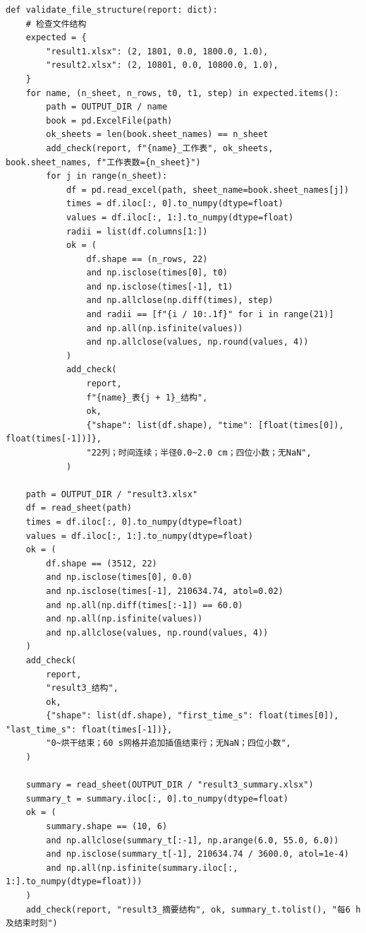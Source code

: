 \documentclass[withoutpreface,bwprint]{cumcm_thesis}
\begin{document}
\begin{appendices}
\begin{lstlisting}
def validate_file_structure(report: dict):
    # 检查文件结构
    expected = {
        "result1.xlsx": (2, 1801, 0.0, 1800.0, 1.0),
        "result2.xlsx": (2, 10801, 0.0, 10800.0, 1.0),
    }
    for name, (n_sheet, n_rows, t0, t1, step) in expected.items():
        path = OUTPUT_DIR / name
        book = pd.ExcelFile(path)
        ok_sheets = len(book.sheet_names) == n_sheet
        add_check(report, f"{name}_工作表", ok_sheets, book.sheet_names, f"工作表数={n_sheet}")
        for j in range(n_sheet):
            df = pd.read_excel(path, sheet_name=book.sheet_names[j])
            times = df.iloc[:, 0].to_numpy(dtype=float)
            values = df.iloc[:, 1:].to_numpy(dtype=float)
            radii = list(df.columns[1:])
            ok = (
                df.shape == (n_rows, 22)
                and np.isclose(times[0], t0)
                and np.isclose(times[-1], t1)
                and np.allclose(np.diff(times), step)
                and radii == [f"{i / 10:.1f}" for i in range(21)]
                and np.all(np.isfinite(values))
                and np.allclose(values, np.round(values, 4))
            )
            add_check(
                report,
                f"{name}_表{j + 1}_结构",
                ok,
                {"shape": list(df.shape), "time": [float(times[0]), float(times[-1])]},
                "22列；时间连续；半径0.0~2.0 cm；四位小数；无NaN",
            )

    path = OUTPUT_DIR / "result3.xlsx"
    df = read_sheet(path)
    times = df.iloc[:, 0].to_numpy(dtype=float)
    values = df.iloc[:, 1:].to_numpy(dtype=float)
    ok = (
        df.shape == (3512, 22)
        and np.isclose(times[0], 0.0)
        and np.isclose(times[-1], 210634.74, atol=0.02)
        and np.all(np.diff(times[:-1]) == 60.0)
        and np.all(np.isfinite(values))
        and np.allclose(values, np.round(values, 4))
    )
    add_check(
        report,
        "result3_结构",
        ok,
        {"shape": list(df.shape), "first_time_s": float(times[0]), "last_time_s": float(times[-1])},
        "0~烘干结束；60 s网格并追加插值结束行；无NaN；四位小数",
    )

    summary = read_sheet(OUTPUT_DIR / "result3_summary.xlsx")
    summary_t = summary.iloc[:, 0].to_numpy(dtype=float)
    ok = (
        summary.shape == (10, 6)
        and np.allclose(summary_t[:-1], np.arange(6.0, 55.0, 6.0))
        and np.isclose(summary_t[-1], 210634.74 / 3600.0, atol=1e-4)
        and np.all(np.isfinite(summary.iloc[:, 1:].to_numpy(dtype=float)))
    )
    add_check(report, "result3_摘要结构", ok, summary_t.tolist(), "每6 h及结束时刻")


\end{lstlisting}
\end{appendices}
\end{document}
